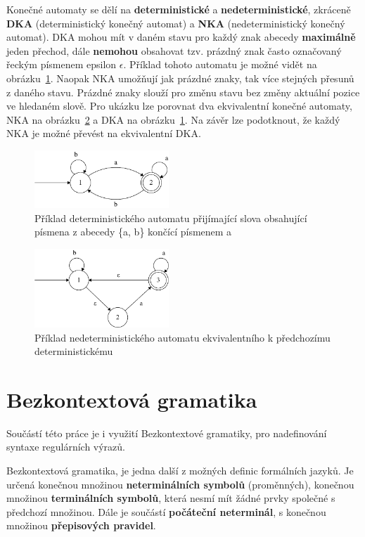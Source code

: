 Konečné automaty se dělí na \textbf{deterministické} a \textbf{nedeterministické}, zkráceně \textbf{DKA} (deterministický konečný automat) a \textbf{NKA} (nedeterministický konečný automat).
DKA mohou mít v daném stavu pro každý znak abecedy \textbf{maximálně} jeden přechod, dále \textbf{nemohou} obsahovat tzv. prázdný znak často označovaný řeckým písmenem epsilon $\epsilon$.
Příklad tohoto automatu je možné vidět na obrázku~\ref{fig:DFAex}.
Naopak NKA umožňují jak prázdné znaky, tak více stejných přesunů z daného stavu. 
Prázdné znaky slouží pro změnu stavu bez změny aktuální pozice ve hledaném slově. 
Pro ukázku lze porovnat dva ekvivalentní konečné automaty,
NKA na obrázku~\ref{fig:NFAex} a DKA na obrázku~\ref{fig:DFAex}.
Na závěr lze podotknout, že každý NKA je možné převést na ekvivalentní DKA.

\begin{figure}[!h]
	\centering
	\includegraphics[width=0.45\textwidth]{Figures/DFA_example.pdf}
	\caption{Příklad deterministického automatu přijímající slova obsahující písmena z abecedy \{a, b\} končící písmenem a}
	\label{fig:DFAex}
\end{figure}

\begin{figure}[!h]
	\centering
	\includegraphics[width=0.45\textwidth]{Figures/NFA_example.pdf}
	\caption{Příklad nedeterministického automatu ekvivalentního k předchozímu deterministickému}
	\label{fig:NFAex}
\end{figure}

\section{Bezkontextová gramatika}
Součástí této práce je i využití Bezkontextové gramatiky, pro nadefinování syntaxe regulárních výrazů.

Bezkontextová gramatika, je jedna další z možných definic formálních jazyků. 
Je určená konečnou množinou \textbf{neterminálních symbolů} (proměnných), konečnou množinou \textbf{terminálních symbolů}, která nesmí mít žádné prvky společné s předchozí množinou.
Dále je součástí \textbf{počáteční neterminál}, s konečnou množinou \textbf{přepisových pravidel}\cite{MUNIFL}.

